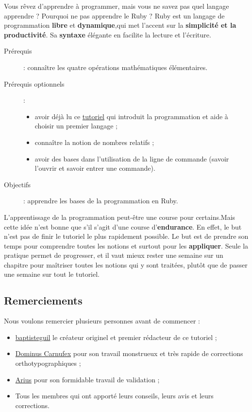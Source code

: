 Vous rêvez d’apprendre à programmer, mais vous ne savez pas quel langage apprendre ? Pourquoi ne pas apprendre le Ruby ? Ruby est un langage de programmation \textbf{libre} et \textbf{dynamique},qui met l’accent sur la \textbf{simplicité et la productivité}. Sa \textbf{syntaxe} élégante en facilite la lecture et l’écriture.

\begin{Information}
\begin{description}
	\item[Prérequis] : connaître les quatre opérations mathématiques élémentaires.
	\item [Prérequis optionnels] : 
	  \begin{itemize} 
      \item avoir déjà lu ce \href{https://zestedesavoir.com/tutoriels/531/les-bases-de-la-programmation}{tutoriel} qui introduit la programmation et aide à choisir un premier langage ;   
		  \item connaître la notion de nombres relatifs ;
		  \item avoir des bases dans l’utilisation de la ligne de commande (savoir l’ouvrir et savoir entrer une commande).
	  \end{itemize}				
	\item[Objectifs] : apprendre les bases de la programmation en Ruby. 
\end{description}
\end{Information}

L’apprentissage de la programmation peut-être une course pour certains.Mais cette idée n’est bonne que s’il s’agit d’une course d’\textbf{endurance}. En effet, le but n’est pas de finir le tutoriel le plus rapidement possible. Le but est de prendre son temps pour comprendre toutes les notions et surtout pour les \textbf{appliquer}. Seule la pratique permet de progresser, et il vaut mieux rester une semaine sur un chapitre pour maîtriser toutes les notions qui y sont traitées, plutôt que de passer une semaine sur tout le tutoriel.

\subsection*{Remerciements}

Nous voulons remercier plusieurs personnes avant de commencer :

\begin{itemize}
\item \href{https://zestedesavoir.com/membres/voir/baptisteguil/}{baptisteguil} le créateur originel et premier rédacteur de ce tutoriel ;
\item \href{https://zestedesavoir.com/membres/voir/Dominus Carnufex}{Dominus Carnufex} pour son travail monstrueux et très rapide de corrections orthotypographiques ;
\item \href{https://zestedesavoir.com/membres/voir/Arius/}{Arius} pour son formidable travail de validation ;
\item Tous les membres qui ont apporté leurs conseils, leurs avis et leurs corrections.
\end{itemize}
